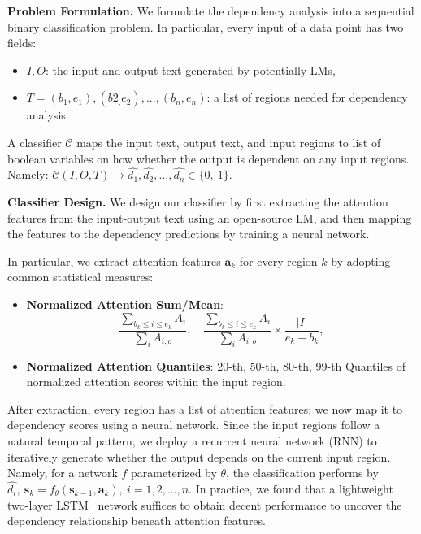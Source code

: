 \textbf{Problem Formulation.} We formulate the dependency analysis into a sequential binary classification problem. In particular, every input of a data point has two fields:
\begin{itemize}
    \item $I, O$: the input and output text generated by potentially LMs,
    \item $T = (b_1, e_1), (b2_, e_2), ..., (b_n, e_n)$: a list of regions needed for dependency analysis.
\end{itemize}

A classifier $\mathcal{C}$ maps the input text, output text, and input regions to list of boolean variables on how whether the output is dependent on any input regions. Namely:
$\mathcal{C}(I, O, T) \rightarrow \hat{d_1}, \hat{d_2}, ..., \hat{d_n} \in \{0,\ 1\}.$

\textbf{Classifier Design.} We design our classifier by first extracting the attention features from the input-output text using an open-source LM, and then mapping the features to the dependency predictions by training a neural network. 

In particular, we extract attention features $\textbf{a}_k$ for every region $k$ by adopting common statistical measures: 
\begin{itemize}[noitemsep]
    \item \textbf{Normalized Attention Sum/Mean}: 
    \[
    \frac{\sum_{b_k \leq i \leq e_k} A_i}{\sum_{i} A_{i,o}}, \quad 
    \frac{\sum_{b_k \leq i \leq e_k} A_i}{\sum_{i} A_{i,o}} \times \frac{|I|}{e_k - b_k},
    \]

    \item \textbf{Normalized Attention Quantiles}: 20-th, 50-th, 80-th, 99-th Quantiles of normalized attention scores within the input region.
\end{itemize}

After extraction, every region has a list of attention features; we now map it to dependency scores using a neural network. Since the input regions follow a natural temporal pattern, we deploy a recurrent neural network (RNN) to iteratively generate whether the output depends on the current input region. Namely, for a network $f$ parameterized by $\theta$, the classification performs by 
$\hat{d_i},\ \textbf{s}_k = f_\theta(\textbf{s}_{k-1}, \textbf{a}_k),\ i = 1, 2, ..., n.
$
In practice, we found that a lightweight two-layer LSTM~\cite{hochreiter1997lstm} network suffices to obtain decent performance to uncover the dependency relationship beneath attention features.

